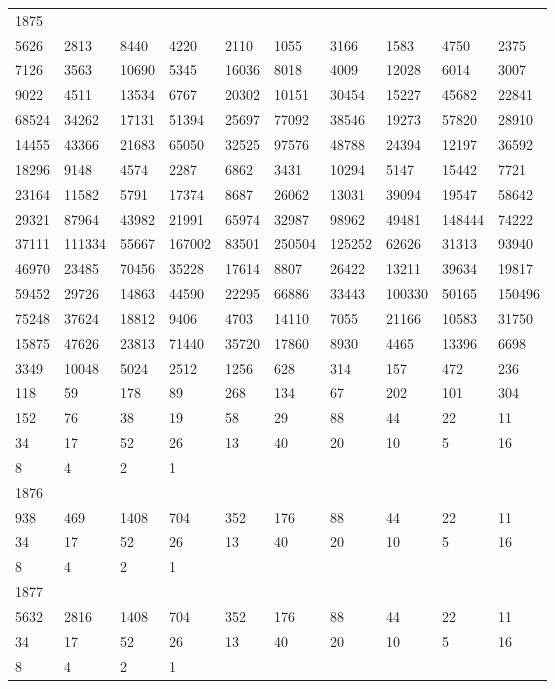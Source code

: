 \begin{longtable}{*{10}{l}}
1875&&&&&&&&&\\
5626& 2813& 8440& 4220& 2110& 1055& 3166& 1583& 4750& 2375\\
7126& 3563& 10690& 5345& 16036& 8018& 4009& 12028& 6014& 3007\\
9022& 4511& 13534& 6767& 20302& 10151& 30454& 15227& 45682& 22841\\
68524& 34262& 17131& 51394& 25697& 77092& 38546& 19273& 57820& 28910\\
14455& 43366& 21683& 65050& 32525& 97576& 48788& 24394& 12197& 36592\\
18296& 9148& 4574& 2287& 6862& 3431& 10294& 5147& 15442& 7721\\
23164& 11582& 5791& 17374& 8687& 26062& 13031& 39094& 19547& 58642\\
29321& 87964& 43982& 21991& 65974& 32987& 98962& 49481& 148444& 74222\\
37111& 111334& 55667& 167002& 83501& 250504& 125252& 62626& 31313& 93940\\
46970& 23485& 70456& 35228& 17614& 8807& 26422& 13211& 39634& 19817\\
59452& 29726& 14863& 44590& 22295& 66886& 33443& 100330& 50165& 150496\\
75248& 37624& 18812& 9406& 4703& 14110& 7055& 21166& 10583& 31750\\
15875& 47626& 23813& 71440& 35720& 17860& 8930& 4465& 13396& 6698\\
3349& 10048& 5024& 2512& 1256& 628& 314& 157& 472& 236\\
118& 59& 178& 89& 268& 134& 67& 202& 101& 304\\
152& 76& 38& 19& 58& 29& 88& 44& 22& 11\\
34& 17& 52& 26& 13& 40& 20& 10& 5& 16\\
8& 4& 2& 1& \\

1876&&&&&&&&&\\
938& 469& 1408& 704& 352& 176& 88& 44& 22& 11\\
34& 17& 52& 26& 13& 40& 20& 10& 5& 16\\
8& 4& 2& 1& \\

1877&&&&&&&&&\\
5632& 2816& 1408& 704& 352& 176& 88& 44& 22& 11\\
34& 17& 52& 26& 13& 40& 20& 10& 5& 16\\
8& 4& 2& 1& \\


\end{longtable}
